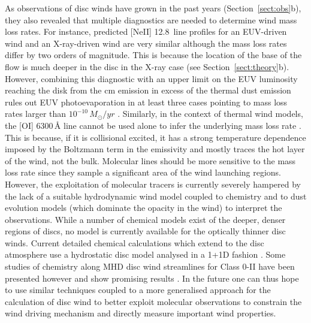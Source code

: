 \documentclass{rsos}
\begin{document}
As observations of disc winds have grown in the past years (Section~\ref{sect:obs}b), they also revealed that multiple diagnostics are needed to determine wind mass loss rates. For instance,  predicted [NeII] 12.8\,\micron{} line profiles for an EUV-driven wind \cite{2008MNRAS.391L..64A} and an X-ray-driven wind \cite{2010MNRAS.406.1553E} are very similar although the mass loss rates differ by two orders of magnitude. This is because the location of the base of the flow is much deeper in the disc in the X-ray case (see Section~\ref{sect:theory}b). 
However, combining this diagnostic with an upper limit on the EUV luminosity reaching the disk from the cm emission in excess of the thermal dust emission \cite{2012ApJ...751L..42P,2013MNRAS.434.3378O} rules out EUV photoevaporation in at least three cases pointing to mass loss rates larger than $10^{-10}\,M_{\odot}/yr$ \cite{2014ApJ...795....1P}. 
Similarly, in the context of thermal wind models, the [OI] 6300\,\AA{} line cannot be used alone to infer the underlying mass loss rate \cite{2016MNRAS.460.3472E}. This is because, if it is collisional excited, it has a strong temperature dependence imposed by the Boltzmann term in the emissivity and mostly traces the hot layer of the wind, not the bulk. Molecular lines should be more sensitive to the mass loss rate since they sample a significant area of the wind launching regions. However, the exploitation of molecular tracers is currently severely hampered by the lack of a suitable hydrodynamic wind model coupled to chemistry and to dust evolution models (which dominate the opacity in the wind) to interpret the observations. While a number of chemical models exist of the deeper, denser regions of discs, no model is currently available for the optically thinner disc winds. 
Current detailed chemical calculations which extend to the disc atmosphere use a hydrostatic disc model analysed in a 1+1D fashion \cite{2009ApJ...705.1237G}.  
Some studies of chemistry along MHD disc wind streamlines for Class 0-II have been presented however and show promising results \cite{2012A&A...538A...2P, 2016A&A...585A..74Y}. In the future one can thus hope to use similar techniques coupled to a more generalised approach for the calculation of disc wind to better exploit molecular observations to  constrain the wind driving mechanism and directly measure important wind properties.  
\end{document}
